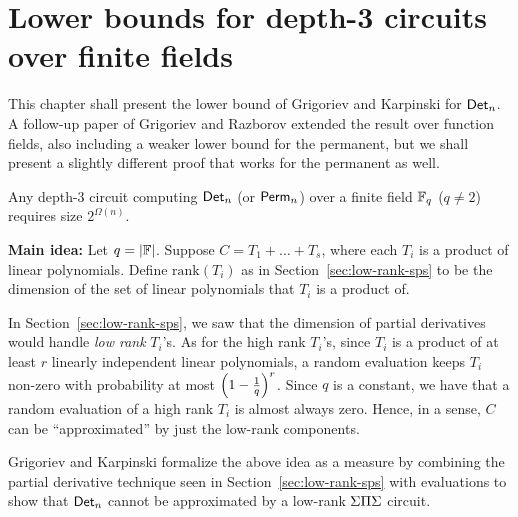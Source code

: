 \chapter{Lower bounds for depth-3 circuits over finite fields}\label{chap:GK}

This chapter shall present the lower bound of Grigoriev and Karpinski \cite{grigoriev98} for $\mathsf{Det}_n$. A follow-up paper of Grigoriev and Razborov \cite{gr00} extended the result over function fields, also including a weaker lower bound for the permanent, but we shall present a slightly different proof that works for the permanent as well.

\begin{theorem}\cite{grigoriev98}\label{thm:gk-main-thm}
  Any depth-3 circuit computing $\mathsf{Det}_n$ (or $\mathsf{Perm}_n$) over a finite field $\mathbb{F}_q$ ($q\neq 2$) requires size $2^{\Omega(n)}$.
\end{theorem}

{\bf Main idea:} Let $q = |\mathbb{F}|$. Suppose $C = T_1 + \dots + T_s$, where each $T_i$ is a product of linear polynomials. Define $\mathrm{rank}(T_i)$ as in Section~\ref{sec:low-rank-sps} to be the dimension of the set of linear polynomials that $T_i$ is a product of.

In Section~\ref{sec:low-rank-sps}, we saw that the dimension of partial derivatives would handle \emph{low rank} $T_i$'s. As for the high rank $T_i$'s, since $T_i$ is a product of at least $r$ linearly independent linear polynomials, a random evaluation keeps $T_i$ non-zero with probability at most $\left(1-\frac{1}{q}\right)^r$. Since $q$ is a constant, we have that a random evaluation of a high rank $T_i$ is almost always zero. Hence, in a sense, $C$ can be ``approximated'' by just the low-rank components.


Grigoriev and Karpinski \cite{grigoriev98} formalize the above idea as a measure by combining the partial derivative technique seen in Section~\ref{sec:low-rank-sps} with evaluations to show that $\mathsf{Det}_n$ cannot be approximated by a low-rank $\Sigma\Pi\Sigma$ circuit.

